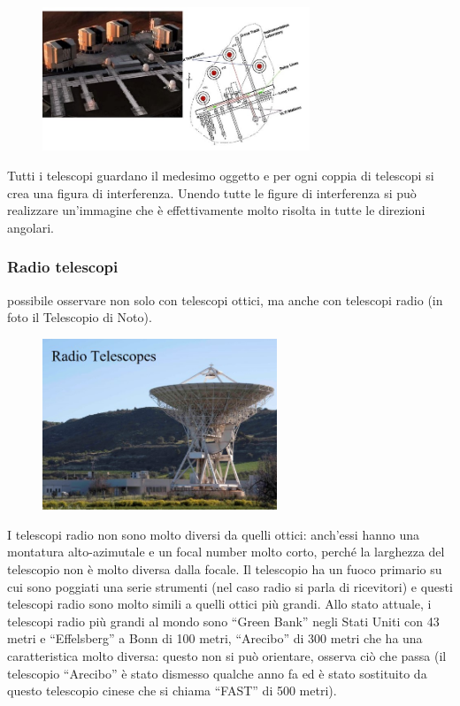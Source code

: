 \begin{figure}[H]
    \centering
    \includegraphics[width=8cm]{30.jpg}
\end{figure}

Tutti i telescopi guardano il medesimo oggetto e per ogni coppia di telescopi si crea una figura di interferenza. Unendo tutte le figure di interferenza si può realizzare un'immagine che è effettivamente molto risolta in tutte le direzioni angolari.

\subsubsection{Radio telescopi}
\E possibile osservare non solo con telescopi ottici, ma anche con telescopi radio (in foto il Telescopio di Noto).

\begin{figure}[H]
    \centering
    \includegraphics[width=7cm]{31.jpg}
\end{figure}

I telescopi radio non sono molto diversi da quelli ottici: anch'essi hanno una montatura alto-azimutale e un focal number molto corto, perché la larghezza del telescopio non è molto diversa dalla focale. Il telescopio ha un fuoco primario su cui sono poggiati una serie strumenti (nel caso radio si parla di ricevitori) e questi telescopi radio sono molto simili a quelli ottici più grandi. Allo stato attuale, i telescopi radio più grandi al mondo sono “Green Bank” negli Stati Uniti con 43 metri e “Effelsberg” a Bonn di 100 metri, “Arecibo” di 300 metri che ha una caratteristica molto diversa: questo non si può orientare, osserva ciò che passa (il telescopio “Arecibo” è stato dismesso qualche anno fa ed è stato sostituito da questo telescopio cinese che si chiama “FAST” di 500 metri). 

